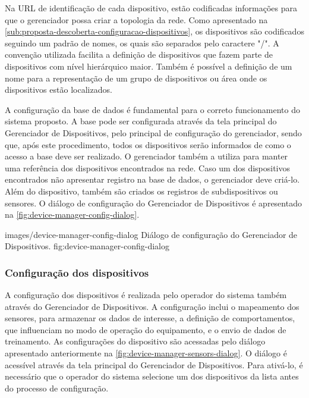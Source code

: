 Na \gls{URL} de identificação de cada dispositivo, estão codificadas informações para que o
gerenciador possa criar a topologia da rede. Como apresentado na
\cref{sub:proposta-descoberta-configuracao-dispositivos}, os dispositivos são codificados seguindo
um padrão de nomes, os quais são separados pelo caractere "/". A convenção utilizada facilita a
definição de dispositivos que fazem parte de dispositivos com nível hierárquico maior. Também é
possível a definição de um nome para a representação de um grupo de dispositivos ou área onde os
dispositivos estão localizados.

A configuração da base de dados é fundamental para o correto funcionamento do sistema proposto. A
base pode ser configurada através da tela principal do Gerenciador de Dispositivos, pelo principal
de configuração do gerenciador, sendo que, após este procedimento, todos os dispositivos serão
informados de como o acesso a base deve ser realizado. O gerenciador também a utiliza para manter
uma referência dos dispositivos encontrados na rede. Caso um dos dispositivos encontrados não
apresentar registro na base de dados, o gerenciador deve criá-lo. Além do dispositivo, também são
criados os registros de subdispositivos ou sensores. O diálogo de configuração do Gerenciador de
Dispositivos é apresentado na \cref{fig:device-manager-config-dialog}.

  {images/device-manager-config-dialog}
  {Diálogo de configuração do Gerenciador de Dispositivos.}
  {fig:device-manager-config-dialog}


\subsubsection{Configuração dos dispositivos}

A configuração dos dispositivos é realizada pelo operador do sistema também através do Gerenciador
de Dispositivos. A configuração inclui o mapeamento dos sensores, para armazenar os dados de
interesse, a definição de comportamentos, que influenciam no modo de operação do equipamento, e o
envio de dados de treinamento. As configurações do dispositivo são acessadas pelo diálogo
apresentado anteriormente na \cref{fig:device-manager-sensors-dialog}. O diálogo é acessível através
da tela principal do Gerenciador de Dispositivos. Para ativá-lo, é necessário que o operador do
sistema selecione um dos dispositivos da lista antes do processo de configuração.



